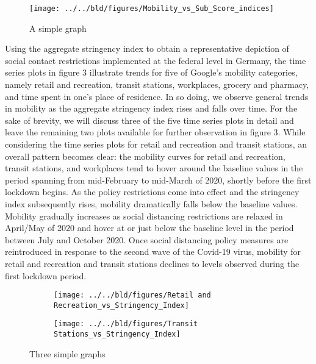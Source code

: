 \begin{figure}[H]
      \centering
      \texttt{[image: ../../bld/figures/Mobility\_vs\_Sub\_Score\_indices]}
      \label{fig:five over x}
      \caption{A simple graph}
      \label{fig:simplegraph}
\end{figure}

Using the aggregate stringency index to obtain a representative depiction of social contact restrictions implemented at the federal level in Germany, the time series plots in figure 3 illustrate trends for five of Google’s mobility categories, namely retail and recreation, transit stations, workplaces, grocery and pharmacy, and time spent in one’s place of residence. In so doing, we observe general trends in mobility as the aggregate stringency index rises and falls over time. For the sake of brevity, we will discuss three of the five time series plots in detail and leave the remaining two plots available for further observation in figure 3. While considering the time series plots for retail and recreation and transit stations, an overall pattern becomes clear: the mobility curves for retail and recreation, transit stations, and workplaces tend to hover around the baseline values in the period spanning from mid-February to mid-March of 2020, shortly before the first lockdown begins. As the policy restrictions come into effect and the stringency index subsequently rises, mobility dramatically falls below the baseline values. Mobility gradually increases as social distancing restrictions are relaxed in April/May of 2020 and hover at or just below the baseline level in the period between July and October 2020. Once social distancing policy measures are reintroduced in response to the second wave of the Covid-19 virus, mobility for retail and recreation and transit stations declines to levels observed during the first lockdown period.

\begin{figure}[H]
     \centering
     \begin{subfigure}[b]{\textwidth}
         \centering
         \texttt{[image: ../../bld/figures/Retail and Recreation\_vs\_Stringency\_Index]}
         \caption{}
         \label{fig:y equals x}
     \end{subfigure}
     \hfill
     \begin{subfigure}[b]{\textwidth}
         \centering
         \texttt{[image: ../../bld/figures/Transit Stations\_vs\_Stringency\_Index]}
         \caption{}
         \label{fig:three sin x}
     \end{subfigure}
        \caption{Three simple graphs}
         \label{fig:four graphs}
\end{figure}

